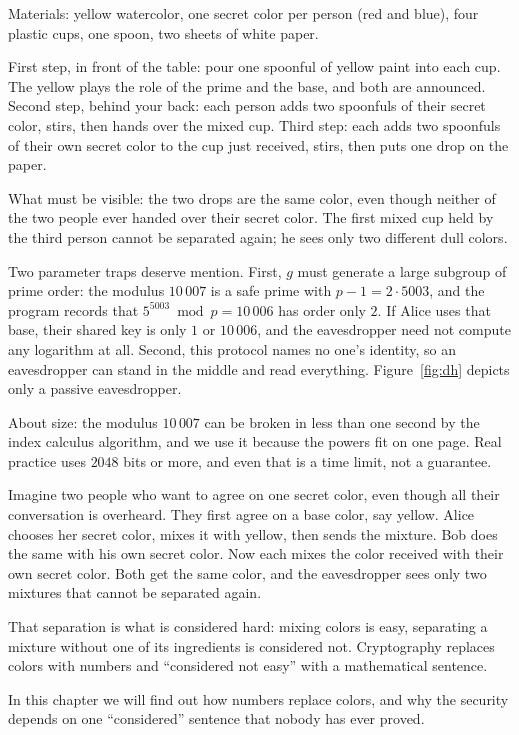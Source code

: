 \begin{tangan}
Materials: yellow watercolor, one secret color per person (red and blue), four plastic cups, one
spoon, two sheets of white paper.

First step, in front of the table: pour one spoonful of yellow paint into each cup. The yellow plays
the role of the prime and the base, and both are announced. Second step, behind your back: each
person adds two spoonfuls of their secret color, stirs, then hands over the mixed cup. Third step:
each adds two spoonfuls of their own secret color to the cup just received, stirs, then puts one drop
on the paper.

What must be visible: the two drops are the same color, even though neither of the two people ever
handed over their secret color. The first mixed cup held by the third person cannot be separated
again; he sees only two different dull colors.
\end{tangan}

Two parameter traps deserve mention. First, $g$ must generate a large subgroup of prime order: the
modulus $10\,007$ is a safe prime with $p-1=2\cdot5003$, and the program records that
$5^{5003}\bmod p=10\,006$ has order only $2$. If Alice uses that base, their shared key is only $1$
or $10\,006$, and the eavesdropper need not compute any logarithm at all. Second, this protocol
names no one's identity, so an eavesdropper can stand in the middle and read everything.
Figure~\ref{fig:dh} depicts only a passive eavesdropper.

About size: the modulus $10\,007$ can be broken in less than one second by the index calculus
algorithm, and we use it because the powers fit on one page. Real practice uses $2048$ bits or more,
and even that is a time limit, not a guarantee.

\begin{untukanak}
Imagine two people who want to agree on one secret color, even though all their conversation is
overheard. They first agree on a base color, say yellow. Alice chooses her secret color, mixes it with
yellow, then sends the mixture. Bob does the same with his own secret color. Now each mixes the color
received with their own secret color. Both get the same color, and the eavesdropper sees only two
mixtures that cannot be separated again.

That separation is what is considered hard: mixing colors is easy, separating a mixture without one
of its ingredients is considered not. Cryptography replaces colors with numbers and ``considered not
easy'' with a mathematical sentence.

In this chapter we will find out how numbers replace colors, and why the security depends on one
``considered'' sentence that nobody has ever proved.
\end{untukanak}

